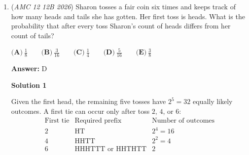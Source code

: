 \begin{enumerate}
This is a sum which can be written as
 \[\sum_{n=1}^{19}\frac{1}{\left(5n\right)\left(5n+5\right)}\]Inside the sum, partial fractions is possible. Let
 \[\frac{A}{5n}+\frac{B}{5n+5}=\frac{1}{\left(5n\right)\left(5n+5\right)}\]This leads to this equation, which is required to match the 1 at the top.
 \[5nA+5A+5nB=1\]Now, n is independent of non-n terms, so you must separate the equations.
 \[5A+5B=0\]because no term depends on n in the numerator, and
 \[5A=1\]since there is a 1. Solving gets this:
 \[A=\frac{1}{5},B=-\frac{1}{5}\]Allowing us to rewrite the sum as
 \[\sum_{n=1}^{19}\left(\frac{1}{25n}-\frac{1}{25n+25}\right)\]Writing the first few terms makes it clear this is a telescoping series!
 \[\left(\frac{1}{25}-\frac{1}{50}\right)+\left(\frac{1}{50}-\frac{1}{75}\right)...\left(\frac{1}{475}-\frac{1}{500}\right)=\frac{1}{25}-\frac{1}{500}\]Now do some algebra.
 \[\frac{n}{100}<\frac{19}{500}<\frac{n+1}{100}\]
 \[5n<19<5n+5\]This inequality makes it clear that 
 \[n=3\]Therefore, $\boxed{\textbf{(B)}}$. --gerund

 



\textbf{Solution 3}

Observe that
 \[\frac{1}{5\cdot 10}+\frac{1}{10\cdot 15} =\frac{4}{10\cdot 15}.\]Adding the next term gives
 \[\frac{4}{10\cdot 15}+\frac{1}{15\cdot 20} =\frac{9}{15\cdot 20}.\]Continuing this pattern, we obtain
 \[\frac{1}{5\cdot 10}+\frac{1}{10\cdot 15} +\cdots+\frac{1}{95\cdot 100} =\frac{19^2}{95\cdot 100} =\frac{361}{9500}\approx 0.038.\]Thus,
 \[\frac{3}{100}<\frac{361}{9500}<\frac{4}{100},\]so $n=3$, and the answer is
 \[\boxed{\textbf{(B)}}.\]-- N0tsniw

 


	\item (\textit{AMC 12 12B 2026}) Sharon tosses a fair coin six times and keeps track of how many heads and tails she has gotten. Her first toss is heads. What is the probability that after every toss Sharon's count of heads differs from her count of tails?


 $\textbf{(A)}\   \frac{1}{8}  \qquad                 \textbf{(B)}\   \frac{3}{16}  \qquad                 \textbf{(C)}\   \frac{1}{4}  \qquad                 \textbf{(D)}\   \frac{5}{16}  \qquad                 \textbf{(E)}\   \frac{3}{8}$

 \textbf{Answer: }D



\textbf{Solution 1}

Given the first head, the remaining five tosses have $2^5=32$ equally likely outcomes. A first tie can occur only after toss $2$, $4$, or $6$:
 \[\begin{array}{c|c|c} \text{First tie}&\text{Required prefix}&\text{Number of outcomes}\\ \hline 2&\text{HT}&2^4=16\\ 4&\text{HHTT}&2^2=4\\ 6&\text{HHHTTT or HHTHTT}&2 \end{array}\]


\end{enumerate}
